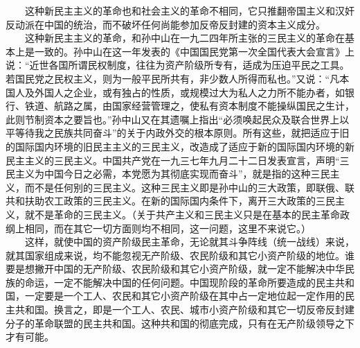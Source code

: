 \documentclass[cn,11pt,chinese]{elegantbook}
\begin{document}
　　这种新民主主义的革命也和社会主义的革命不相同，它只推翻帝国主义和汉奸反动派在中国的统治，而不破坏任何尚能参加反帝反封建的资本主义成分。\\
　　这种新民主主义的革命，和孙中山在一九二四年所主张的三民主义的革命在基本上是一致的。孙中山在这一年发表的《中国国民党第一次全国代表大会宣言》上说：“近世各国所谓民权制度，往往为资产阶级所专有，适成为压迫平民之工具。若国民党之民权主义，则为一般平民所共有，非少数人所得而私也。”又说：“凡本国人及外国人之企业，或有独占的性质，或规模过大为私人之力所不能办者，如银行、铁道、航路之属，由国家经营管理之，使私有资本制度不能操纵国民之生计，此则节制资本之要旨也。”孙中山又在其遗嘱上指出“必须唤起民众及联合世界上以平等待我之民族共同奋斗”的关于内政外交的根本原则。所有这些，就把适应于旧的国际国内环境的旧民主主义的三民主义，改造成了适应于新的国际国内环境的新民主主义的三民主义。中国共产党在一九三七年九月二十二日发表宣言，声明“三民主义为中国今日之必需，本党愿为其彻底实现而奋斗”，就是指的这种三民主义，而不是任何别的三民主义。这种三民主义即是孙中山的三大政策，即联俄、联共和扶助农工政策的三民主义。在新的国际国内条件下，离开三大政策的三民主义，就不是革命的三民主义。（关于共产主义和三民主义只是在基本的民主革命政纲上相同，而在其它一切方面则均不相同，这一问题，这里不来说它。）\\
　　这样，就使中国的资产阶级民主革命，无论就其斗争阵线（统一战线）来说，就其国家组成来说，均不能忽视无产阶级、农民阶级和其它小资产阶级的地位。谁要是想撇开中国的无产阶级、农民阶级和其它小资产阶级，就一定不能解决中华民族的命运，一定不能解决中国的任何问题。中国现阶段的革命所要造成的民主共和国，一定要是一个工人、农民和其它小资产阶级在其中占一定地位起一定作用的民主共和国。换言之，即是一个工人、农民、城市小资产阶级和其它一切反帝反封建分子的革命联盟的民主共和国。这种共和国的彻底完成，只有在无产阶级领导之下才有可能。\\
\end{document}
